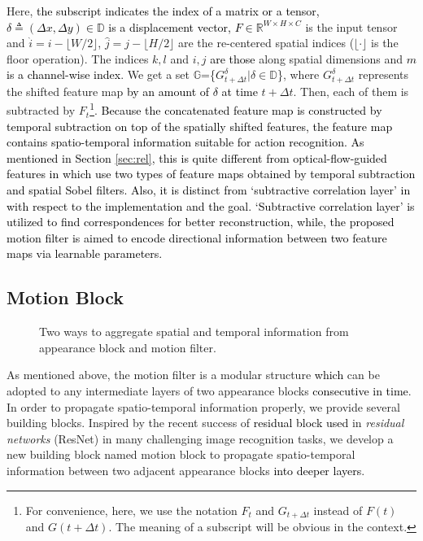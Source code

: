 \documentclass[runningheads]{llncs}
\newcommand{\nj}[1]{\textcolor{black}{#1}}
\newcommand{\mg}[1]{\textcolor{black}{#1}}
\begin{document}
Here, \nj{the subscript indicates the index of a matrix or a tensor,}
\nj{$\delta \triangleq (\Delta x, \Delta y) \in \mathbb{D}$ is a displacement vector, $F \in{\mathbb{R}^{W\times H \times C}}$} is the input tensor and $\hat{i}=i-\lfloor W/2 \rfloor$, $\hat{j}=j-\lfloor H/2 \rfloor$ are the re-centered spatial indices ($\lfloor \cdot \rfloor$ is the floor operation). The indices $k,l$ and $i,j$ \nj{are those} along spatial dimensions and \nj{$m$ is a channel-wise index}. We get a set $\mathbb{G}$=\{$G^{\delta}_{t+\Delta t} | {\delta} \in \mathbb{D} $\}, where $G^{\delta}_{t+\Delta t}$ represents the shifted feature map \nj{by an amount of $\delta$ at time} $t+\Delta{t}$. Then, each of them is subtracted by $F_t$\footnote{For convenience, here, we use the notation $F_t$ and $G_{t+\Delta t}$ instead of $F(t)$ and $G(t+\Delta t)$. The meaning of a subscript will be obvious in the context.}. 
\nj{Because the concatenated feature map is constructed by temporal subtraction on top of the spatially shifted features, the feature map contains spatio-temporal information suitable for action recognition. As mentioned in Section \ref{sec:rel}, this is quite different from optical-flow-guided features in \cite{DBLP:journals/corr/abs-1711-11152} which use two types of feature maps obtained by  temporal subtraction and spatial Sobel filters.} \mg{Also, it is distinct from `subtractive correlation layer' in \cite{dosovitskiy2015flownet} with respect to the implementation and the goal. `Subtractive correlation layer' is utilized to find correspondences for better reconstruction, while, the proposed motion filter is aimed to encode directional information between two feature maps via learnable parameters.}

\subsection{Motion Block}

\begin{figure}[t]
	\centering
    \caption{Two ways to aggregate spatial and temporal information from appearance block and motion filter.}
    \label{fig:motionblock}
\end{figure}

As mentioned above, the motion filter is a modular structure \nj{which} can be adopted to any intermediate layers of two appearance blocks \nj{consecutive in time}. In order to propagate spatio-temporal information properly, we provide several building blocks. Inspired by the recent success of \mg{residual block used} in \textit{residual networks} (ResNet) in many challenging image recognition tasks, we develop a new building block named motion block to propagate spatio-temporal information between two adjacent appearance blocks \nj{into deeper layers}.
\end{document}
